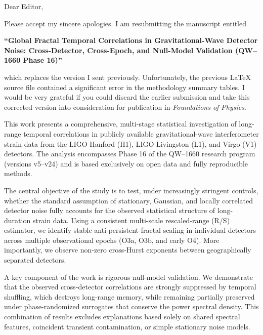 \documentclass[11pt,a4paper]{article}
\begin{document}
\vspace{0.5cm}

\noindent Dear Editor,

\bigskip

\noindent Please accept my sincere apologies. I am resubmitting the manuscript entitled

\medskip

\noindent \textbf{``Global Fractal Temporal Correlations in Gravitational-Wave Detector Noise: Cross-Detector, Cross-Epoch, and Null-Model Validation (QW–1660 Phase 16)''}

\medskip

\noindent which replaces the version I sent previously. Unfortunately, the previous LaTeX source file contained a significant error in the methodology summary tables. I would be very grateful if you could discard the earlier submission and take this corrected version into consideration for publication in \textit{Foundations of Physics}.

\bigskip

\noindent This work presents a comprehensive, multi-stage statistical investigation of long-range temporal correlations in publicly available gravitational-wave interferometer strain data from the LIGO Hanford (H1), LIGO Livingston (L1), and Virgo (V1) detectors. The analysis encompasses Phase 16 of the QW–1660 research program (versions v5–v24) and is based exclusively on open data and fully reproducible methods.

\bigskip

\noindent The central objective of the study is to test, under increasingly stringent controls, whether the standard assumption of stationary, Gaussian, and locally correlated detector noise fully accounts for the observed statistical structure of long-duration strain data. Using a consistent multi-scale rescaled-range (R/S) estimator, we identify stable anti-persistent fractal scaling in individual detectors across multiple observational epochs (O3a, O3b, and early O4). More importantly, we observe non-zero cross-Hurst exponents between geographically separated detectors.

\bigskip

\noindent A key component of the work is rigorous null-model validation. We demonstrate that the observed cross-detector correlations are strongly suppressed by temporal shuffling, which destroys long-range memory, while remaining partially preserved under phase-randomized surrogates that conserve the power spectral density. This combination of results excludes explanations based solely on shared spectral features, coincident transient contamination, or simple stationary noise models.
\end{document}
